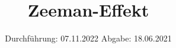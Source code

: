 

\subject{Versuch Nr.V27}
\title{Zeeman-Effekt}
\date{%
  Durchführung: 07.11.2022
  \hspace{3em}
  Abgabe: 18.06.2021
}



\maketitle
\thispagestyle{empty}
\tableofcontents
\newpage 






%

\nocite{*}

\printbibliography{}



